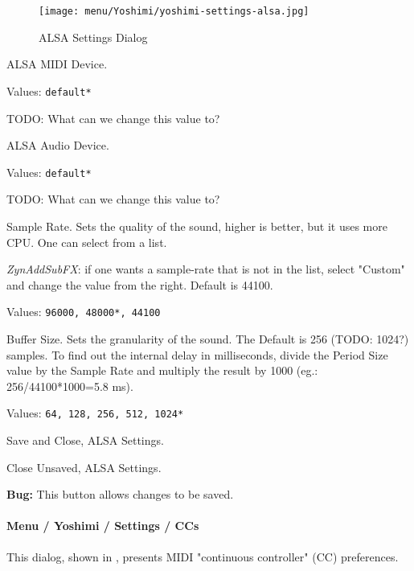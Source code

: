 \begin{figure}[H]
   \centering 
   \texttt{[image: menu/Yoshimi/yoshimi-settings-alsa.jpg]}
   \caption[ALSA Settings]{ALSA Settings Dialog}
   \label{fig:yoshimi_settings_alsa}
\end{figure}

   \setcounter{ItemCounter}{0}      %

   ALSA MIDI Device.

   Values: \texttt{default*}

   TODO: What can we change this value to?

   ALSA Audio Device.

   Values: \texttt{default*}

   TODO: What can we change this value to?

   Sample Rate.
   Sets the quality of the sound, higher is better, but it uses more CPU.
   One can select from a list.
   
   \textsl{ZynAddSubFX}: if one wants a sample-rate that
   is not in the list, select "Custom" and change the value from the right.
   Default is 44100.

   Values: \texttt{96000, 48000*, 44100}

   Buffer Size.
   Sets the granularity of the sound. The Default is 256 (TODO: 1024?)
   samples. To find out the internal delay in milliseconds, divide the
   Period Size value by the Sample Rate and multiply the result by 1000
   (eg.: 256/44100*1000=5.8 ms).

   Values: \texttt{64, 128, 256, 512, 1024*}

   Save and Close, ALSA Settings.

   Close Unsaved, ALSA Settings.

   \textbf{Bug:}
   This button allows changes to be saved.

\paragraph{Menu / Yoshimi / Settings / CCs}
\label{paragraph:menu_yoshimi_settings_ccs}

   This dialog, shown in
   ,
   presents MIDI "continuous controller" (CC) preferences.

